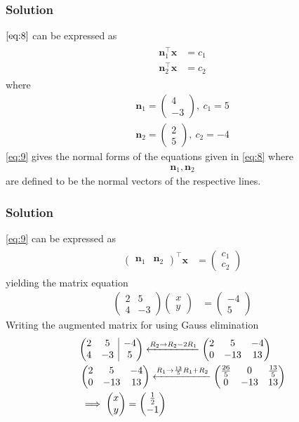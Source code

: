 \documentclass{beamer}
\makeatletter
\theoremstyle{remark}
\newcommand{\myvec}[1]{\ensuremath{\begin{pmatrix}#1\end{pmatrix}}}
\newenvironment{amatrix}[1]{%
  \left(\begin{array}{@{}*{#1}{c}|c@{}}
}{%
  \end{array}\right)
}
\let\vec\mathbf
\makeatother
\begin{document}
\begin{frame}
\frametitle{Solution}
$\eqref{eq:8}$
    can be expressed as
\begin{align}
\label{eq:9}
\begin{split}
    \vec{n}_1^{\top}\vec{x} &= c_1
    \\
    \vec{n}_2^{\top}\vec{x} &= c_2
\end{split}
\end{align}
where
\begin{align}
	\vec{n}_1 = \myvec{4\\-3},\ c_1 = 5
	\\
	\vec{n}_2 = \myvec{2\\5},\ c_2 = -4
\end{align}
\eqref{eq:9} gives the normal forms of the equations given in 
\eqref{eq:8}  where 
\begin{align}
\vec{n}_1, \vec{n}_2 
\end{align}
are defined to be the normal vectors of the respective lines.
\end{frame}
\begin{frame}
\frametitle{Solution}
\eqref{eq:9}
can be expressed as
\begin{align}
\begin{split}
	\myvec{\vec{n}_1 & \vec{n}_2}^{\top}\vec{x} &= \myvec{ c_1 \\ c_2}
\end{split}
\end{align}
yielding the matrix equation
\begin{align}
    \myvec{
        2 & 5\\ 
        4 & -3
    }
    \myvec{
        x\\
        y
    } &= \myvec{
        -4\\
        5
    } 
    \end{align}
    Writing the augmented matrix for using Gauss elimination
    \begin{align}
        &\begin{amatrix}{2}
   2 & 5 & -4 \\  4 & -3 & 5
 \end{amatrix} \xleftarrow{R_2 \to R_2-2R_1}
  \myvec{
   2 & 5 & -4 \\  0 & -13 & 13
 } 
 \\
&\myvec{
   2 & 5 & -4 \\  0 & -13 & 13
 } \xleftarrow{R_1 \to \frac{13}{5}R_1+R_2}
 \myvec{
   \frac{26}{5} & 0 & \frac{13}{5} \\  0 & -13 & 13
 }  \label{14}
 \\
    & \implies \myvec{
        x\\
        y
    } =
    \myvec{
        \frac{1}{2}\\
        -1
    }
    \end{align}
\end{frame}
\end{document}
